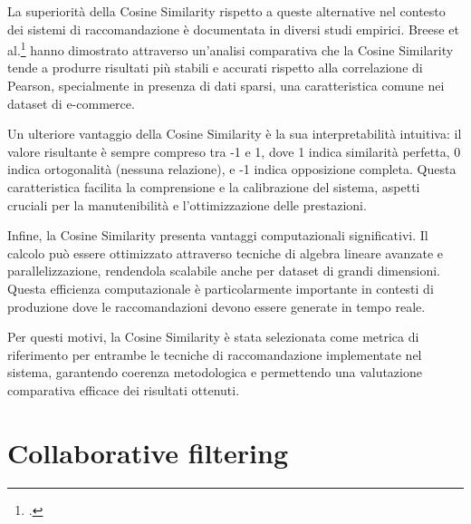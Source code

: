 La superiorità della Cosine Similarity rispetto a queste alternative nel contesto dei sistemi di raccomandazione è documentata in diversi studi empirici. Breese et al.\footcite{article:empirical-analysis-predictive-algorithms} hanno dimostrato attraverso un'analisi comparativa che la Cosine Similarity tende a produrre risultati più stabili e accurati rispetto alla correlazione di Pearson, specialmente in presenza di dati sparsi, una caratteristica comune nei dataset di e-commerce.

Un ulteriore vantaggio della Cosine Similarity è la sua interpretabilità intuitiva: il valore risultante è sempre compreso tra -1 e 1, dove 1 indica similarità perfetta, 0 indica ortogonalità (nessuna relazione), e -1 indica opposizione completa. Questa caratteristica facilita la comprensione e la calibrazione del sistema, aspetti cruciali per la manutenibilità e l'ottimizzazione delle prestazioni.

Infine, la Cosine Similarity presenta vantaggi computazionali significativi. Il calcolo può essere ottimizzato attraverso tecniche di algebra lineare avanzate e parallelizzazione, rendendola scalabile anche per dataset di grandi dimensioni. Questa efficienza computazionale è particolarmente importante in contesti di produzione dove le raccomandazioni devono essere generate in tempo reale.

Per questi motivi, la Cosine Similarity è stata selezionata come metrica di riferimento per entrambe le tecniche di raccomandazione implementate nel sistema, garantendo coerenza metodologica e permettendo una valutazione comparativa efficace dei risultati ottenuti.



\section{Collaborative filtering}

